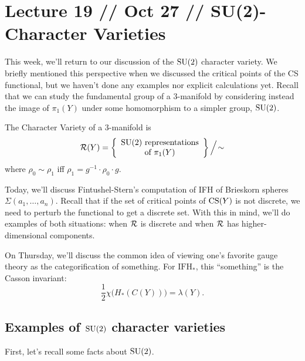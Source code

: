 \documentclass[main]{subfiles}
\begin{document}
\section*{Lecture 19 // Oct 27 // SU(2)-Character Varieties}

This week, we'll return to our discussion of the $\operatorname{SU}(2)$ character variety. We briefly mentioned this perspective when we discussed the critical points of the CS functional, but we haven't done any examples nor explicit calculations yet. Recall that we can study the fundamental group of a $3$-manifold by considering instead the image of $\pi_1(Y)$ under some homomorphism to a simpler group, $\operatorname{SU}(2)$.

\begin{definition}
The Character Variety of a $3$-manifold is
\[
\mathcal{R}(Y) = \left\{\begin{array}{c}\operatorname{SU}(2) \text{ representations} \\ \text{of } \pi_1(Y)\end{array}\right\}\Big/\!\sim
\]
where $\rho_0\sim\rho_1$ iff $\rho_1 = g^{-1}\cdot\rho_0\cdot g$.
\end{definition}

Today, we'll discuss Fintushel-Stern's computation of IFH of Brieskorn spheres $\Sigma(a_1,\dots,a_n)$. Recall that if the set of critical points of $\operatorname{CS}(Y)$ is not discrete, we need to perturb the functional to get a discrete set. With this in mind, we'll do examples of both situations: when $\mathcal{R}$ is discrete and when $\mathcal{R}$ has higher-dimensional components.

On Thursday, we'll discuss the common idea of viewing one's favorite gauge theory as the categorification of something. For $\mathrm{IFH}_\ast$, this ``something'' is the Casson invariant:
\[
\frac{1}{2}\chi\big(H_\ast(C(Y))\big) = \lambda(Y).
\]

\subsection*{Examples of $\operatorname{SU}(2)$ character varieties}

First, let's recall some facts about $\operatorname{SU}(2)$.
\end{document}

